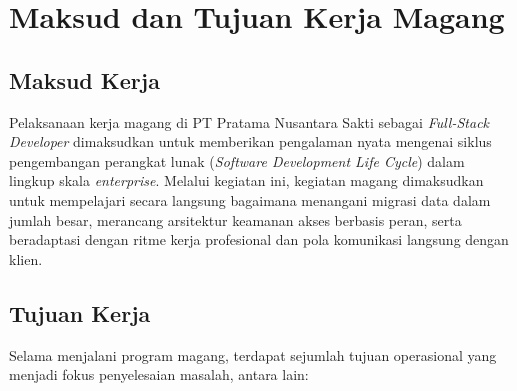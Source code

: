 \section{Maksud dan Tujuan Kerja Magang}
 
\subsection{Maksud Kerja}
 
\medskip
 
Pelaksanaan kerja magang di PT Pratama Nusantara Sakti sebagai
\textit{Full-Stack Developer} dimaksudkan untuk memberikan pengalaman nyata
mengenai siklus pengembangan perangkat lunak (\textit{Software Development Life
Cycle}) dalam lingkup skala \textit{enterprise}. Melalui kegiatan ini, kegiatan magang 
dimaksudkan untuk mempelajari secara langsung bagaimana menangani migrasi data dalam 
jumlah besar, merancang arsitektur keamanan akses berbasis peran, serta beradaptasi dengan 
ritme kerja profesional dan pola komunikasi langsung dengan klien.
 
\subsection{Tujuan Kerja}
 
\medskip
 
Selama menjalani program magang, terdapat sejumlah tujuan operasional yang
menjadi fokus penyelesaian masalah, antara lain:
 
\vspace{0.5em}
 
